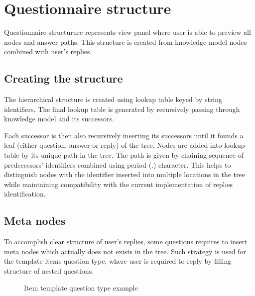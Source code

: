 \section{Questionnaire structure}\label{sec:questionnaire-structure}

Questionnaire structurure represents view panel where user is able to preview all nodes and answer paths.
This structure is created from knowledge model nodes combined with user's replies.

\subsection{Creating the structure}

The hierarchical structure is created using lookup table keyed by string identifiers.
The final lookup table is generated by recursively passing through knowledge model and its successors.

Each successor is then also recursively inserting its successors until it founds a leaf (either question, answer or reply) of the tree.
Nodes are added into lookup table by its unique path in the tree.
The path is given by chaining sequence of predecessors' identifiers combined using period (.) character.
This helps to distinguish nodes with the identifier inserted into multiple locations in the tree while maintaining compatibility with the current implementation of replies identification.

\subsection{Meta nodes}\label{sec:meta-nodes}

To accomplish clear structure of user's replies, some questions requires to insert meta nodes which actually does not exists in the tree.
Such strategy is used for the template items question type, where user is required to reply by filling structure of nested questions.

\begin{figure}[H]
    \caption{Item template question type example}\label{fig:item-template}
\end{figure}

